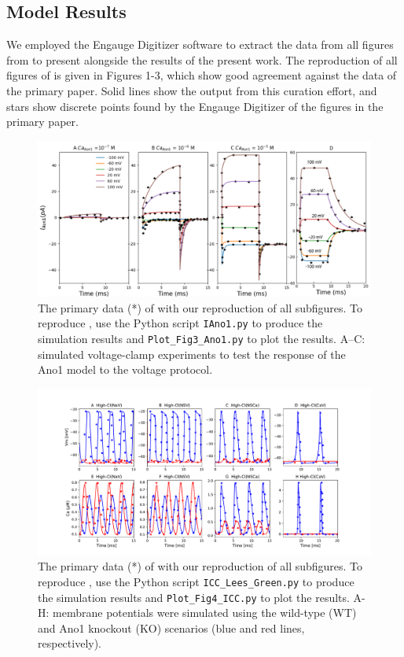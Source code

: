 \documentclass[fleqn,10pt]{physiome}
\begin{document}
\subsection{Model Results}
We employed the Engauge Digitizer software \citep{mark_mitchell_2020_3941227} to extract the data from all figures from  \citet{lees2014computational} to present alongside the results of the present work. The reproduction of all figures of \citet{lees2014computational} is given in Figures 1-3, which show good agreement against the data of the primary paper. Solid lines show the output from this curation effort, and stars show discrete points found by the Engauge Digitizer of the figures in the primary paper.
\begin{figure}[ht!]\centering
\includegraphics[width=1.00\linewidth]{Figure3.pdf}
\caption{The primary data (*) of \cite[Figure 3]{lees2014computational} with our reproduction of all subfigures. To reproduce \citet[Figure 3]{lees2014computational}, use the Python script \texttt{IAno1.py} to produce the simulation results and \texttt{Plot\_Fig3\_Ano1.py} to plot the results. A–C: simulated voltage-clamp experiments to test the response of the Ano1 model to the voltage protocol.}
\label{fig:fig3}
\end{figure}
\newpage
\begin{figure}[ht!]%
\hspace*{-2.6cm} \includegraphics[scale=0.55]{Figure4.pdf}
\caption{The primary data (*) of \cite[Figure 4]{lees2014computational} with our reproduction of all subfigures. To reproduce \cite[Figure 4]{lees2014computational}, use the Python script \texttt{ICC\_Lees\_Green.py} to produce the simulation results and \texttt{Plot\_Fig4\_ICC.py} to plot the results. A-H: membrane potentials were simulated using the wild-type (WT) and Ano1 knockout (KO) scenarios (blue and red lines, respectively).}
\label{fig:fig4}
\end{figure}
\end{document}
